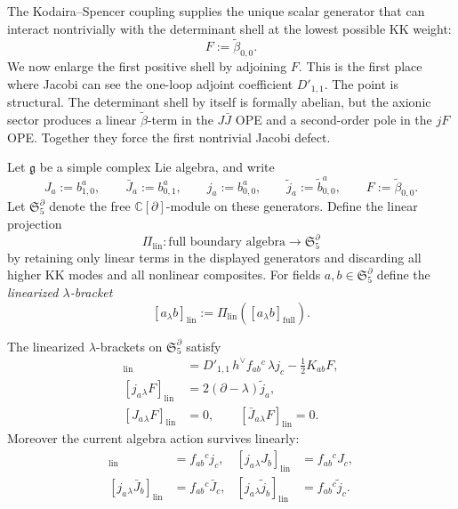 The Kodaira--Spencer coupling supplies the unique scalar generator that can
interact nontrivially with the determinant shell at the lowest possible KK
weight:
\[
F:=\widetilde\beta_{0,0}.
\]
We now enlarge the first positive shell by adjoining $F$.
This is the first place where Jacobi can see the one-loop adjoint
coefficient $D'_{1,1}$.
The point is structural.
The determinant shell by itself is formally abelian, but the axionic sector
produces a linear $\widetilde\beta$-term in the $J\bar J$ OPE and a
second-order pole in the $jF$ OPE.
Together they force the first nontrivial Jacobi defect.

Let $\mathfrak g$ be a simple complex Lie algebra, and write
\[
J_a:=b^a_{1,0},
\qquad
\bar J_a:=b^a_{0,1},
\qquad
j_a:=b^a_{0,0},
\qquad
\widetilde j_a:=\widetilde b^a_{0,0},
\qquad
F:=\widetilde\beta_{0,0}.
\]
Let $\mathfrak S_5^{\partial}$ denote the free
$\mathbb C[\partial]$-module on these generators.
Define the linear projection
\[
\Pi_{\mathrm{lin}}\colon \text{full boundary algebra}
\longrightarrow \mathfrak S_5^{\partial}
\]
by retaining only linear terms in the displayed generators and discarding
all higher KK modes and all nonlinear composites.
For fields $a,b\in \mathfrak S_5^{\partial}$ define the
\emph{linearized $\lambda$-bracket}
\[
[a_{\lambda}b]_{\mathrm{lin}}:=\Pi_{\mathrm{lin}}([a_{\lambda}b]_{\mathrm{full}}).
\]

\begin{lemma}
\label{lem:frontier-five-generator-brackets}
The linearized $\lambda$-brackets on $\mathfrak S_5^{\partial}$ satisfy
\begin{align*}
[J_a{}_{\lambda}\bar J_b]_{\mathrm{lin}}
&=
D'_{1,1}\,h^\vee f_{ab}{}^c\,\lambda j_c
-\frac12 K_{ab}F,
\\
[j_a{}_{\lambda}F]_{\mathrm{lin}}
&=
2(\partial-\lambda)\widetilde j_a,
\\
[J_a{}_{\lambda}F]_{\mathrm{lin}}&=0,
\qquad
[\bar J_a{}_{\lambda}F]_{\mathrm{lin}}=0.
\end{align*}
Moreover the current algebra action survives linearly:
\begin{align*}
[j_a{}_{\lambda}j_b]_{\mathrm{lin}}&=f_{ab}{}^c j_c,
&[j_a{}_{\lambda}J_b]_{\mathrm{lin}}&=f_{ab}{}^c J_c,
\\
[j_a{}_{\lambda}\bar J_b]_{\mathrm{lin}}&=f_{ab}{}^c \bar J_c,
&[j_a{}_{\lambda}\widetilde j_b]_{\mathrm{lin}}&=f_{ab}{}^c\widetilde j_c.
\end{align*}
\end{lemma}

